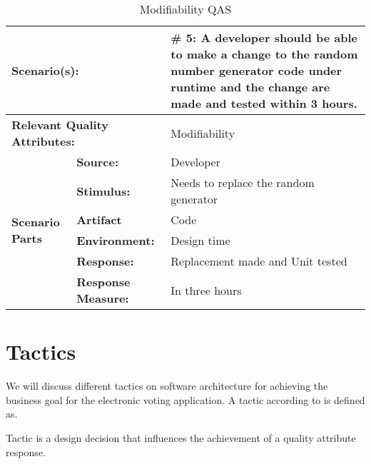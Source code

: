 \begin{table}[H]
\begin{center}
\begin{tabular}{|p{0.3cm}|p{2.5cm}|p{8cm}|}
  \hline
  \multicolumn{2}{|p{3cm}|}{\bfseries Scenario(s):} & \#  5: A developer should be able to make a change to the random number generator code under runtime and the change are made and tested within 3 hours. \\
  \hline
  \multicolumn{2}{|p{3cm}|}{\bfseries Relevant Quality Attributes:} & Modifiability\\
  \hline
  \multirow{6}{*}{\begin{sideways}{\bfseries Scenario Parts}\end{sideways}}
  & {\bfseries Source:} & Developer \\
  \cline{2-3}
  & {\bfseries Stimulus:} & Needs to replace the random generator \\
  \cline{2-3}
  & {\bfseries Artifact} &  Code \\
  \cline{2-3}
  & {\bfseries Environment:} &  Design time \\
  \cline{2-3}
  & {\bfseries Response:} &  Replacement made and Unit tested\\
  \cline{2-3}
  & {\bfseries Response Measure:} & In three hours\\
  \hline
\end{tabular}
\caption{Modifiability QAS}
\end{center}
\end{table}


\section{Tactics}

\noindent
We will discuss different tactics on software architecture for achieving the business goal for the electronic voting application. A tactic according to \cite{Bass} is defined as.

\begin{defi}
Tactic is a design decision that influences the achievement of a quality attribute response. 
\end{defi}
